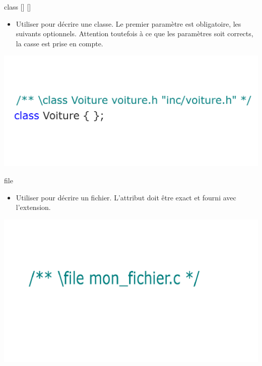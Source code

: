 \documentclass{beamer}
\begin{document}
\begin{frame}{class [] []  }
\begin{itemize}
  \item {
  Utiliser pour décrire une classe. Le premier paramètre est obligatoire, les suivants optionnels. Attention toutefois à ce que les paramètres soit corrects, la casse est prise en compte.
  }
\end{itemize}

\includegraphics[scale=0.20]{Images/m3.png} 

\end{frame}

\begin{frame}{file }
\begin{itemize}
  \item {
  Utiliser pour décrire un fichier. L'attribut doit être exact et fourni avec l'extension.
  }
\end{itemize}

\includegraphics[scale=0.20]{Images/m4.png} 

\end{frame}
\end{document}
